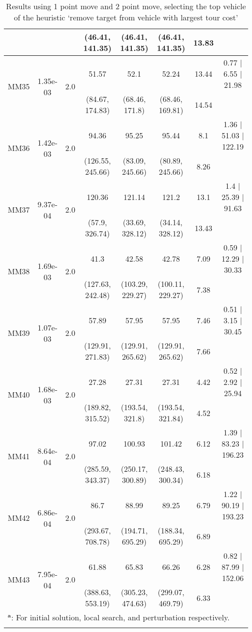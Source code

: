 \begin{longtable}{|c|c|c|c|c|c|c|c|}
	 &  &  & (46.41, 141.35) & (46.41, 141.35) & (46.41, 141.35) & 13.83 & \\
 	\hline
	\multirow{2}{*}{MM35} & \multirow{2}{*}{1.35e-03} & \multirow{2}{*}{2.0} & 51.57 & 52.1 & 52.24 & 13.44 & 0.77 $\mid$ 6.55 $\mid$ 21.98\\
	 &  &  & (84.67, 174.83) & (68.46, 171.8) & (68.46, 169.81) & 14.54 & \\
 	\hline
	\multirow{2}{*}{MM36} & \multirow{2}{*}{1.42e-03} & \multirow{2}{*}{2.0} & 94.36 & 95.25 & 95.44 & 8.1 & 1.36 $\mid$ 51.03 $\mid$ 122.19\\
	 &  &  & (126.55, 245.66) & (83.09, 245.66) & (80.89, 245.66) & 8.26 & \\
 	\hline
	\multirow{2}{*}{MM37} & \multirow{2}{*}{9.37e-04} & \multirow{2}{*}{2.0} & 120.36 & 121.14 & 121.2 & 13.1 & 1.4 $\mid$ 25.39 $\mid$ 91.63\\
	 &  &  & (57.9, 326.74) & (33.69, 328.12) & (34.14, 328.12) & 13.43 & \\
 	\hline
	\multirow{2}{*}{MM38} & \multirow{2}{*}{1.69e-03} & \multirow{2}{*}{2.0} & 41.3 & 42.58 & 42.78 & 7.09 & 0.59 $\mid$ 12.29 $\mid$ 30.33\\
	 &  &  & (127.63, 242.48) & (103.29, 229.27) & (100.11, 229.27) & 7.38 & \\
 	\hline
	\multirow{2}{*}{MM39} & \multirow{2}{*}{1.07e-03} & \multirow{2}{*}{2.0} & 57.89 & 57.95 & 57.95 & 7.46 & 0.51 $\mid$ 3.15 $\mid$ 30.45\\
	 &  &  & (129.91, 271.83) & (129.91, 265.62) & (129.91, 265.62) & 7.66 & \\
 	\hline
	\multirow{2}{*}{MM40} & \multirow{2}{*}{1.68e-03} & \multirow{2}{*}{2.0} & 27.28 & 27.31 & 27.31 & 4.42 & 0.52 $\mid$ 2.92 $\mid$ 25.94\\
	 &  &  & (189.82, 315.52) & (193.54, 321.8) & (193.54, 321.84) & 4.52 & \\
 	\hline
	\multirow{2}{*}{MM41} & \multirow{2}{*}{8.64e-04} & \multirow{2}{*}{2.0} & 97.02 & 100.93 & 101.42 & 6.12 & 1.39 $\mid$ 83.23 $\mid$ 196.23\\
	 &  &  & (285.59, 343.37) & (250.17, 300.89) & (248.43, 300.34) & 6.18 & \\
 	\hline
	\multirow{2}{*}{MM42} & \multirow{2}{*}{6.86e-04} & \multirow{2}{*}{2.0} & 86.7 & 88.99 & 89.25 & 6.79 & 1.22 $\mid$ 90.19 $\mid$ 193.23\\
	 &  &  & (293.67, 708.78) & (194.71, 695.29) & (188.34, 695.29) & 6.89 & \\
 	\hline
	\multirow{2}{*}{MM43} & \multirow{2}{*}{7.95e-04} & \multirow{2}{*}{2.0} & 61.88 & 65.83 & 66.26 & 6.28 & 0.82 $\mid$ 87.99 $\mid$ 152.06\\
	 &  &  & (388.63, 553.19) & (305.23, 474.63) & (299.07, 469.79) & 6.33 & \\
 	\hline
	\multicolumn{8}{l}{$^{\mathrm{\boldsymbol{a}}}$: For initial solution, local search, and perturbation respectively.}\\

\caption{Results using 1 point move and 2 point move, selecting the top vehicle of the heuristic \lq remove target from vehicle with largest tour cost\rq }
\end{longtable}
